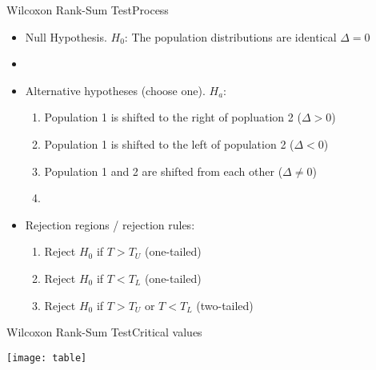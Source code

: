 \documentclass[xcolor=dvipsnames]{beamer}
\begin{document}
\begin{frame}{Wilcoxon Rank-Sum Test}{Process}
	\begin{itemize}
		\item Null Hypothesis. $H_0$: The population distributions are identical $\Delta = 0$
		\item[]
		\item Alternative hypotheses (choose one). $H_a$:
			\begin{enumerate}
				\item Population 1 is shifted to the right of popluation 2 ($\Delta >0$)
				\item Population 1 is shifted to the left of population 2 ($\Delta < 0$)
				\item Population 1 and 2 are shifted from each other ($\Delta \neq 0$)
				\item[]
			\end{enumerate}
		\item Rejection regions / rejection rules:
		\begin{enumerate}
			\item Reject $H_0$ if $T > T_U$ (one-tailed)
			\item Reject $H_0$ if $T < T_L$ (one-tailed)
			\item Reject $H_0$ if $T > T_U$ or $T < T_L$ (two-tailed)
		\end{enumerate}
		\end{itemize}
\end{frame}

\begin{frame}{Wilcoxon Rank-Sum Test}{Critical values}
	\begin{center}
		\texttt{[image: table]}
	\end{center}
\end{frame}
\end{document}
